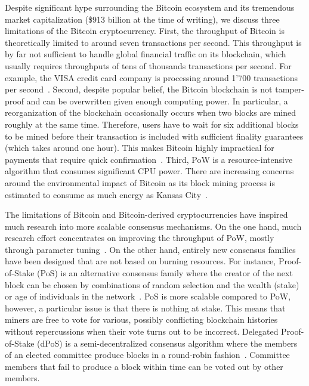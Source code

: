 Despite significant hype surrounding the Bitcoin ecosystem and its tremendous market capitalization (\$913 billion at the time of writing), we discuss three limitations of the Bitcoin cryptocurrency.
First, the throughput of Bitcoin is theoretically limited to around seven transactions per second.
This throughput is by far not sufficient to handle global financial traffic on its blockchain, which usually requires throughputs of tens of thousands transactions per second.
For example, the VISA credit card company is processing around 1'700 transactions per second~\cite{sedgwick2018no}.
Second, despite popular belief, the Bitcoin blockchain is not tamper-proof and can be overwritten given enough computing power.
In particular, a reorganization of the blockchain occasionally occurs when two blocks are mined roughly at the same time.
Therefore, users have to wait for six additional blocks to be mined before their transaction is included with sufficient finality guarantees (which takes around one hour).
This makes Bitcoin highly impractical for payments that require quick confirmation~\cite{bamert2013have}.
Third, PoW is a resource-intensive algorithm that consumes significant CPU power.
There are increasing concerns around the environmental impact of Bitcoin as its block mining process is estimated to consume as much energy as Kansas City~\cite{stoll2019carbon}.

The limitations of Bitcoin and Bitcoin-derived cryptocurrencies have inspired much research into more scalable consensus mechanisms.
On the one hand, much research effort concentrates on improving the throughput of PoW, mostly through parameter tuning~\cite{gervais2016security,karame2016security}.
On the other hand, entirely new consensus families have been designed that are not based on burning resources.
For instance, Proof-of-Stake (PoS) is an alternative consensus family where the creator of the next block can be chosen by combinations of random selection and the wealth (stake) or age of individuals in the network~\cite{king2012ppcoin}.
PoS is more scalable compared to PoW, however, a particular issue is that there is nothing at stake.
This means that miners are free to vote for various, possibly conflicting blockchain histories without repercussions when their vote turns out to be incorrect.
Delegated Proof-of-Stake (dPoS) is a semi-decentralized consensus algorithm where the members of an elected committee produce blocks in a round-robin fashion~\cite{larimer2014delegated}.
Committee members that fail to produce a block within time can be voted out by other members.

